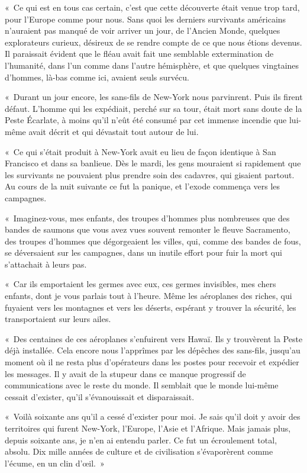 \documentclass[french,twoside]{book} %
\newcommand\chapterclose{} %
\begin{document}
« Ce qui est en tous cas certain, c’est que cette découverte était venue trop tard, pour l’Europe comme pour nous. Sans quoi les derniers survivants américains n’auraient pas manqué de voir arriver un jour, de l’Ancien Monde, quelques explorateurs curieux, désireux de se rendre compte de ce que nous étions devenus. Il paraissait évident que le fléau avait fait une semblable extermination de l’humanité, dans l’un comme dans l’autre hémisphère, et que quelques vingtaines d’hommes, là-bas comme ici, avaient seuls survécu.\par
« Durant un jour encore, les sans-fils de New-York nous parvinrent. Puis ils firent défaut. L’homme qui les expédiait, perché sur sa tour, était mort sans doute de la Peste Écarlate, à moins qu’il n’eût été consumé par cet immense incendie que lui-même avait décrit et qui dévastait tout autour de lui.\par
« Ce qui s’était produit à New-York avait eu lieu de façon identique à San Francisco et dans sa banlieue. Dès le mardi, les gens mouraient si rapidement que les survivants ne pouvaient plus prendre soin des cadavres, qui gisaient partout. Au cours de la nuit suivante ce fut la panique, et l’exode commença vers les campagnes.\par
« Imaginez-vous, mes enfants, des troupes d’hommes plus nombreuses que des bandes de saumons que vous avez vues souvent remonter le fleuve Sacramento, des troupes d’hommes que dégorgeaient les villes, qui, comme des bandes de fous, se déversaient sur les campagnes, dans un inutile effort pour fuir la mort qui s’attachait à leurs pas.\par
« Car ils emportaient les germes avec eux, ces germes invisibles, mes chers enfants, dont je vous parlais tout à l’heure. Même les aéroplanes des riches, qui fuyaient vers les montagnes et vers les déserts, espérant y trouver la sécurité, les transportaient sur leurs ailes.\par
« Des centaines de ces aéroplanes s’enfuirent vers Hawaï. Ils y trouvèrent la Peste déjà installée. Cela encore nous l’apprîmes par les dépêches des sans-fils, jusqu’au moment où il ne resta plus d’opérateurs dans les postes pour recevoir et expédier les messages. Il y avait de la stupeur dans ce manque progressif de communications avec le reste du monde. Il semblait que le monde lui-même cessait d’exister, qu’il s’évanouissait et disparaissait.\par
« Voilà soixante ans qu’il a cessé d’exister pour moi. Je sais qu’il doit y avoir des territoires qui furent New-York, l’Europe, l’Asie et l’Afrique. Mais jamais plus, depuis soixante ans, je n’en ai entendu parler. Ce fut un écroulement total, absolu. Dix mille années de culture et de civilisation s’évaporèrent comme l’écume, en un clin d’œil. »
\chapterclose
\end{document}
